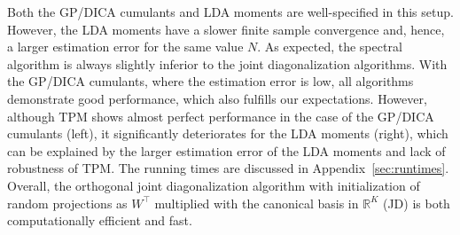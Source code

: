 \documentclass{article}
\newcommand{\rr}[1]{\mathbb{R}^{#1}}
\begin{document}
Both the GP/DICA cumulants and LDA moments are well-specified in this setup. However, the LDA moments have a slower finite sample convergence and, hence, a larger estimation error for the same value $N$. As expected, the spectral algorithm is always slightly inferior to the joint diagonalization algorithms. With the GP/DICA cumulants, where the estimation error is low, all algorithms demonstrate good performance, which also fulfills our expectations. 
However, although TPM shows almost perfect performance in the case of the GP/DICA cumulants (left), it significantly deteriorates for the LDA moments (right), which can be explained by the larger estimation error of the LDA moments and lack of robustness of TPM. 
The running times are discussed in Appendix~\ref{sec:runtimes}.
Overall, the orthogonal joint diagonalization algorithm with initialization of random projections as $W^{\top}$ multiplied with the canonical basis in $\rr{K}$ (JD) is both computationally efficient and fast.
\end{document}
